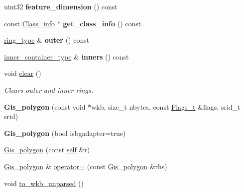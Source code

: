 \begin{DoxyCompactItemize}
uint32 {\bfseries feature\+\_\+dimension} () const
\item 
\mbox{\label{classGis__polygon_a0225332532a5b227531cfdb37e89ede9}} 
const \mbox{\hyperlink{classGeometry_1_1Class__info}{Class\+\_\+info}} $\ast$ {\bfseries get\+\_\+class\+\_\+info} () const
\item 
\mbox{\label{classGis__polygon_ac37f8713e03bbf9b97ad061bf368b1e3}} 
\mbox{\hyperlink{classGis__polygon__ring}{ring\+\_\+type}} \& {\bfseries outer} () const
\item 
\mbox{\label{classGis__polygon_a649d555ec815fc17c6a02c25dd71ee41}} 
\mbox{\hyperlink{classGis__wkb__vector}{inner\+\_\+container\+\_\+type}} \& {\bfseries inners} () const
\item 
\mbox{\label{classGis__polygon_a5c1c0a72f515727e686db428beb730e0}} 
void \mbox{\hyperlink{classGis__polygon_a5c1c0a72f515727e686db428beb730e0}{clear}} ()
\begin{DoxyCompactList}\small\item\em Clears outer and inner rings. \end{DoxyCompactList}\item 
\mbox{\label{classGis__polygon_a25118bf79ef6463986e7c2b081909d72}} 
{\bfseries Gis\+\_\+polygon} (const void $\ast$wkb, size\+\_\+t nbytes, const \mbox{\hyperlink{classGeometry_1_1Flags__t}{Flags\+\_\+t}} \&flags, srid\+\_\+t srid)
\item 
\mbox{\label{classGis__polygon_a923318b7066fd3b2c6da7e58436e897c}} 
{\bfseries Gis\+\_\+polygon} (bool isbgadapter=true)
\item 
\mbox{\hyperlink{classGis__polygon_a5d3928384d1b9de85ceddfa783a1be1c}{Gis\+\_\+polygon}} (const \mbox{\hyperlink{classGis__polygon}{self}} \&r)
\item 
\mbox{\hyperlink{classGis__polygon}{Gis\+\_\+polygon}} \& \mbox{\hyperlink{classGis__polygon_a939b261fcd715c924a5a33dfa579c6e1}{operator=}} (const \mbox{\hyperlink{classGis__polygon}{Gis\+\_\+polygon}} \&rhs)
\item 
void \mbox{\hyperlink{classGis__polygon_a7bd6ed68da450be85891eb39142d3e60}{to\+\_\+wkb\+\_\+unparsed}} ()
\item 

\end{DoxyCompactItemize}

